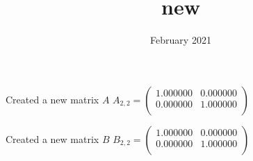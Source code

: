 \documentclass{article}
\title{new}
\date{February 2021}
\begin{document}
Created a new matrix $A$
$A_{2,2}=
\begin{pmatrix}
1.000000 & 0.000000 \\ 
0.000000 & 1.000000 \\ 
\end{pmatrix}$



Created a new matrix $B$
$B_{2,2}=
\begin{pmatrix}
1.000000 & 0.000000 \\ 
0.000000 & 1.000000 \\ 
\end{pmatrix}$
\end{document}
